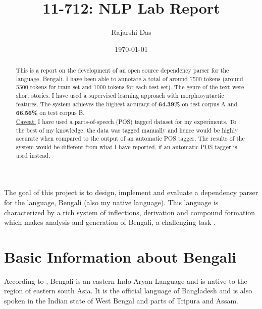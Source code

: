 \documentclass[11pt,letterpaper]{article}
\title{11-712:  NLP Lab Report}
\author{Rajarshi Das}
\date{\today}
\newcommand{\nascomment}[1]{\textcolor{blue}{\textbf{[#1 --NAS]}}}
\begin{document}
\maketitle
\begin{abstract}
\noindent This is a report on the development of an open source dependency parser for the language, Bengali. I have been able to annotate a total of around 7500 tokens (around 5500 tokens for train set and 1000 tokens for each test set). The genre of the text were short stories. I have used a supervised learning approach with morphosyntactic features. The system achieves the highest accuracy of \textbf{64.39\%} on test corpus A and \textbf{66.56\%} on test corpus B. \\
\underline{Caveat:} I have used a parts-of-speech (POS) tagged dataset for my experiments. To the best of my knowledge, the data was tagged manually and hence would be highly accurate when compared to the output of an automatic POS tagger. The results of the system would be different from what I have reported, if an automatic POS tagger is used instead.
\end{abstract}

\noindent The goal of this project is to design, implement and evaluate a dependency parser for the language, Bengali (also my native language). This language is characterized by a rich system of inflections, derivation and compound formation \citep{saha2004computer,chakroborty2003uchchotoro} which makes analysis and generation of Bengali, a challenging task \citep{ghosh2009dependency}.

\section{Basic Information about Bengali}
According to \citep{ethnologue}, Bengali is an eastern Indo-Aryan Language and is native to the region of eastern south Asia. It is the official language of Bangladesh and is also spoken in the Indian state of West Bengal and parts of Tripura and Assam.\\
\end{document}
